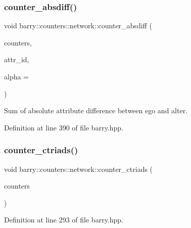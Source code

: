 \subsubsection{\texorpdfstring{counter\+\_\+absdiff()}{counter\_absdiff()}}
{\footnotesize\ttfamily void barry\+::counters\+::network\+::counter\+\_\+absdiff (\begin{DoxyParamCaption}\item[{\hyperlink{namespacebarry_1_1counters_1_1network_a3b3c590303d47840d1967372ae495d95}{Net\+Counter\+Vector} $\ast$}]{counters,  }\item[{\hyperlink{namespacebarry_a11dfc53ddb4672278319aa04f1e09a6c}{uint}}]{attr\+\_\+id,  }\item[{double}]{alpha = {} }\end{DoxyParamCaption})\hspace{0.3cm}{\ttfamily [inline]}}



Sum of absolute attribute difference between ego and alter. 



Definition at line 390 of file barry.\+hpp.

\mbox{\label{namespacebarry_1_1counters_1_1network_a5262c1e8a14c9956041adead348a4890}} 
\subsubsection{\texorpdfstring{counter\+\_\+ctriads()}{counter\_ctriads()}}
{\footnotesize\ttfamily void barry\+::counters\+::network\+::counter\+\_\+ctriads (\begin{DoxyParamCaption}\item[{\hyperlink{namespacebarry_1_1counters_1_1network_a3b3c590303d47840d1967372ae495d95}{Net\+Counter\+Vector} $\ast$}]{counters }\end{DoxyParamCaption})\hspace{0.3cm}{\ttfamily [inline]}}



Definition at line 293 of file barry.\+hpp.

\mbox{\label{namespacebarry_1_1counters_1_1network_a8c7ef19041094ac55a17106940c7d244}} 
